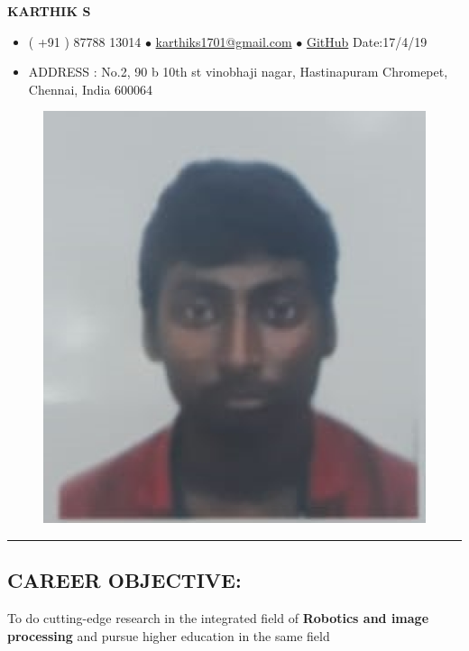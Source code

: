 \documentclass[10pts]{report}
\newcommand{\tab}[1]{\hspace{.2667\textwidth}\rlap{#1}}
\begin{document}
\centering 
 \textbf{KARTHIK S  }     


\begin{itemize}         

\item( +91 ) 87788 13014 
 $\bullet$  \href{mailto:karthiks1701@gmail.com}{karthiks1701@gmail.com}
 $\bullet$ \href{https://github.com/karthiks1701/karthiks1701}{GitHub}  \tab{} Date:17/4/19
\item{ ADDRESS : No.2, 90 b 10th st vinobhaji nagar, Hastinapuram Chromepet, Chennai, India 600064}
\end{itemize}

                           
                         


\begin{figure}{}

\centering
\graphicspath{{./images/}}
\includegraphics[scale=0.2]{capture.png}


\end{figure}


\par\noindent\rule{\textwidth}{0.4pt}
\begin{flushleft}
         \section*{CAREER OBJECTIVE:}
                  To do cutting-edge research in the integrated field of  \textbf{Robotics and image processing} and pursue higher education in the same field   
\end{flushleft}
\end{document}
